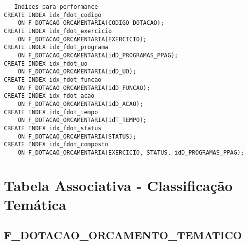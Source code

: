 \documentclass[12pt,a4paper]{article}
\begin{document}
\begin{lstlisting}
-- Indices para performance
CREATE INDEX idx_fdot_codigo 
    ON F_DOTACAO_ORCAMENTARIA(CODIGO_DOTACAO);
CREATE INDEX idx_fdot_exercicio 
    ON F_DOTACAO_ORCAMENTARIA(EXERCICIO);
CREATE INDEX idx_fdot_programa 
    ON F_DOTACAO_ORCAMENTARIA(idD_PROGRAMAS_PPAG);
CREATE INDEX idx_fdot_uo 
    ON F_DOTACAO_ORCAMENTARIA(idD_UO);
CREATE INDEX idx_fdot_funcao 
    ON F_DOTACAO_ORCAMENTARIA(idD_FUNCAO);
CREATE INDEX idx_fdot_acao 
    ON F_DOTACAO_ORCAMENTARIA(idD_ACAO);
CREATE INDEX idx_fdot_tempo 
    ON F_DOTACAO_ORCAMENTARIA(idT_TEMPO);
CREATE INDEX idx_fdot_status 
    ON F_DOTACAO_ORCAMENTARIA(STATUS);
CREATE INDEX idx_fdot_composto 
    ON F_DOTACAO_ORCAMENTARIA(EXERCICIO, STATUS, idD_PROGRAMAS_PPAG);
\end{lstlisting}

\section{Tabela Associativa - Classificação Temática}

\subsection{F\_DOTACAO\_ORCAMENTO\_TEMATICO}
\end{document}

